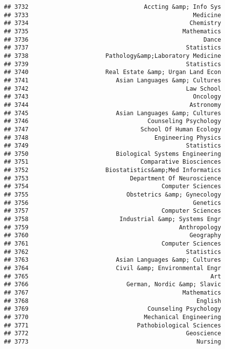 \documentclass[
]{article}
\begin{document}
\begin{verbatim}
## 3732                                 Accting &amp; Info Sys
## 3733                                               Medicine
## 3734                                              Chemistry
## 3735                                            Mathematics
## 3736                                                  Dance
## 3737                                             Statistics
## 3738                      Pathology&amp;Laboratory Medicine
## 3739                                             Statistics
## 3740                      Real Estate &amp; Urgan Land Econ
## 3741                         Asian Languages &amp; Cultures
## 3742                                             Law School
## 3743                                               Oncology
## 3744                                              Astronomy
## 3745                         Asian Languages &amp; Cultures
## 3746                                  Counseling Psychology
## 3747                                School Of Human Ecology
## 3748                                    Engineering Physics
## 3749                                             Statistics
## 3750                         Biological Systems Engineering
## 3751                                Comparative Biosciences
## 3752                      Biostatistics&amp;Med Informatics
## 3753                             Department Of Neuroscience
## 3754                                      Computer Sciences
## 3755                            Obstetrics &amp; Gynecology
## 3756                                               Genetics
## 3757                                      Computer Sciences
## 3758                          Industrial &amp; Systems Engr
## 3759                                           Anthropology
## 3760                                              Geography
## 3761                                      Computer Sciences
## 3762                                             Statistics
## 3763                         Asian Languages &amp; Cultures
## 3764                         Civil &amp; Environmental Engr
## 3765                                                    Art
## 3766                            German, Nordic &amp; Slavic
## 3767                                            Mathematics
## 3768                                                English
## 3769                                  Counseling Psychology
## 3770                                 Mechanical Engineering
## 3771                               Pathobiological Sciences
## 3772                                             Geoscience
## 3773                                                Nursing

\end{verbatim}
\end{document}

